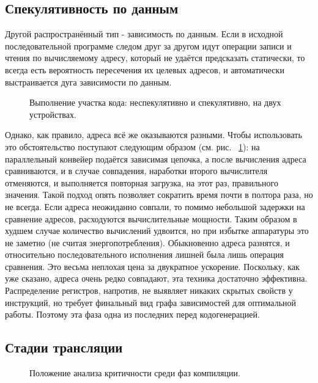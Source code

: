 \documentclass[a4paper,12pt,titlepage]{article}
\newcommand*{\fig}[1]{рис. ~{\ref{fig:#1}}}
\begin{document}
\subsection{Спекулятивность по данным}
Другой распространённый тип - зависимость по данным. Если в исходной последовательной программе следом друг за другом идут операции записи и чтения по вычисляемому адресу, который не удаётся предсказать статически, то всегда есть вероятность пересечения их целевых адресов, и автоматически выстраивается дуга зависимости по данным.

\begin{figure}[h!]
	\centering
	
	\caption{Выполнение участка кода: неспекулятивно и спекулятивно, на двух устройствах.}
	\label{fig:data-spec-ways}
\end{figure}
 Однако, как правило, адреса всё же оказываются разными. Чтобы использовать это обстоятельство поступают следующим образом (см. \fig{data-spec-ways}):
 на параллельный конвейер подаётся зависимая цепочка, а после вычисления адреса сравниваются, и в случае совпадения, наработки второго вычислителя отменяются, и выполняется повторная загрузка, на этот раз, правильного значения.
 Такой подход опять позволяет сократить время почти в полтора раза, но не всегда. Если адреса неожиданно совпали, то помимо небольшой задержки на сравнение адресов, расходуются вычислительные мощности. Таким образом  в худшем случае количество вычислений удвоится, но при избытке аппаратуры это не заметно (не считая энергопотребления). Обыкновенно адреса разнятся, и относительно последовательного исполнения лишней была лишь операция сравнения. Это весьма неплохая цена за двукратное ускорение. Поскольку, как уже сказано, адреса очень редко совпадают, эта техника достаточно эффективна.
Распределение регистров, напротив, не выявляет никаких скрытых свойств у инструкций, но требует финальный вид графа зависимостей для оптимальной работы. Поэтому эта фаза одна из последних перед кодогенерацией.

\subsection{Стадии трансляции}
\begin{wrapfigure}{r}{0.3\textwidth}
	\vspace{-1.5cm}
	
	\vspace{-0.5cm}
	\caption{Положение анализа критичности среди фаз компиляции.}
	\label{fig:compilation-phases}
	\vspace{-2cm}
\end{wrapfigure}
\end{document}

